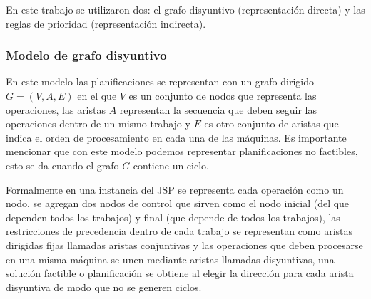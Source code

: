En este trabajo se utilizaron dos: el grafo disyuntivo (representación directa) y las reglas de prioridad (representación indirecta).
\subsubsection*{Modelo de grafo disyuntivo} 
En este modelo las planificaciones se representan con un grafo dirigido $G=(V,A,E)$ en el que $V$ es un conjunto de nodos que representa las operaciones, las aristas $A$ representan la secuencia que deben seguir las operaciones dentro de un mismo trabajo y $E$ es otro conjunto de aristas que indica el orden de procesamiento en cada una de las máquinas. Es importante mencionar que con este modelo podemos representar planificaciones no factibles, esto se da cuando el grafo $G$ contiene un ciclo.


Formalmente en una instancia del JSP se representa cada operación como un nodo, se agregan dos nodos de control que sirven como el nodo inicial (del que dependen todos los trabajos) y final (que depende de todos los trabajos), las restricciones de precedencia dentro de cada trabajo se representan como aristas dirigidas fijas llamadas aristas conjuntivas y las operaciones que deben procesarse en una misma máquina se unen mediante aristas llamadas disyuntivas, una solución factible o planificación se obtiene al elegir la dirección para cada arista disyuntiva de modo que no se generen ciclos.   

